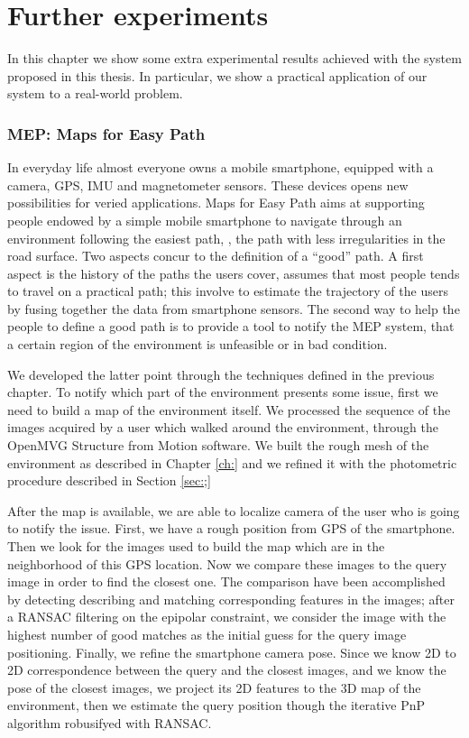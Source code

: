\chapter{Further experiments}
In this chapter we show some extra experimental results achieved with the system proposed in this thesis.
In particular, we show a practical application of our system to a real-world problem. 
\subsection{MEP: Maps for Easy Path}
In everyday life almost everyone owns a mobile smartphone, equipped with a camera, GPS, IMU and magnetometer sensors. 
These devices opens new possibilities for veried applications.
Maps for Easy Path aims at supporting people endowed by a simple mobile smartphone to navigate through an environment following the easiest path, \ie, the path with less irregularities in the road surface. 
Two aspects concur to the definition of a ``good'' path.
A first aspect is the history of the paths the users cover, assumes that most people tends to travel on a practical path; this involve to estimate the trajectory of the users by fusing together the data from smartphone sensors. 
The second way to help the people to define a good path is to provide a tool to notify the MEP system, that a certain  region of the environment is unfeasible or in bad condition.

We developed the latter point through the techniques defined in the previous chapter.
To notify which part of the environment presents some issue, first we need to build a map of the environment itself. 
We processed the sequence of the images acquired by a user which walked around the environment, through the OpenMVG Structure from Motion software. 
We built the rough mesh of the environment as described in Chapter \ref{ch:} and we refined it with the photometric procedure described in Section \ref{sec:;}

After the map is available, we are able to localize  camera  of the user who is going to notify the issue.
First, we have a rough position from GPS of the smartphone. 
Then we look for the images used to build the map which are in the neighborhood of this GPS location.
Now we compare these images to the query image in order to find the closest one. 
The comparison have been accomplished by detecting describing  and matching corresponding features in the images; after a RANSAC filtering on the epipolar constraint, we consider the image with the highest number of good matches as the initial guess for the query image positioning.
Finally, we refine the smartphone camera pose. 
Since we know 2D to 2D correspondence between the query and the closest images, and we know the pose of the closest images, we project its 2D features to the 3D map of the environment, then we estimate the query position though the iterative PnP algorithm \cite{hartley2003multiple} robusifyed with RANSAC.




